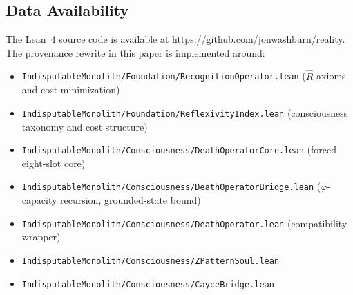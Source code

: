 \documentclass[11pt,a4paper]{article}
\theoremstyle{definition}
\newcommand{\phig}{\varphi}
\newcommand{\Rhat}{\hat{R}}
\newcommand{\code}[1]{\texttt{\small #1}}
\begin{document}
\subsection*{Data Availability}

The Lean~4 source code is available at
\url{https://github.com/jonwashburn/reality}.  The provenance rewrite in this
paper is implemented around:
\begin{itemize}
\item \code{IndisputableMonolith/Foundation/RecognitionOperator.lean} ($\Rhat$ axioms and cost minimization)
\item \code{IndisputableMonolith/Foundation/ReflexivityIndex.lean} (consciousness taxonomy and cost structure)
\item \code{IndisputableMonolith/Consciousness/DeathOperatorCore.lean} (forced eight-slot core)
\item \code{IndisputableMonolith/Consciousness/DeathOperatorBridge.lean} ($\phig$-capacity recursion, grounded-state bound)
\item \code{IndisputableMonolith/Consciousness/DeathOperator.lean} (compatibility wrapper)
\item \code{IndisputableMonolith/Consciousness/ZPatternSoul.lean}
\item \code{IndisputableMonolith/Consciousness/CayceBridge.lean}
\end{itemize}
\end{document}
